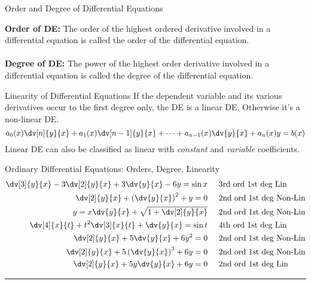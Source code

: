\begin{definition}{Order and Degree of Differential Equations}{}
    
    \textbf{Order of DE:} The order of the highest ordered derivative involved in a differential equation is called the order of the differential equation. \\~\\
    \textbf{Degree of DE:} The power of the highest order derivative involved in a differential equation is called the degree of the differential equation.
\end{definition}

\begin{definition}{Linearity of Differential Equations}{}
    If the dependent variable  and its various derivatives occur to the first degree only, the DE is a linear DE. Otherwise it's a non-linear DE. \[
        a_0(x)\dv[n]{y}{x} + a_1(x)\dv[n-1]{y}{x} + \cdots + a_{n-1}(x)\dv{y}{x} + a_n(x)y = b(x)
    \] Linear DE can also be classified as linear with \textit{constant} and \textit{variable} coefficients.
\end{definition}

\begin{example}{Ordinary Differential Equations: Orders, Degree, Linearity}{}
    \begin{align*}
        \dv[3]{y}{x} - 3\dv[2]{y}{x} + 3\dv{y}{x} - 6y = \sin{x} &\text\;\;\;\;\;\text{3rd ord 1st deg Lin} \\
        \dv[2]{y}{x} + \left( \dv{y}{x} \right)^2 + y = 0 &\text\;\;\;\;\;\text{2nd ord 1st deg Non-Lin} \\
        y = x\dv{y}{x} + \sqrt{1 + \dv[2]{y}{x} } &\text\;\;\;\;\;\text{2nd ord 1st deg Non-Lin} \\
        \dv[4]{x}{t} + t^2\dv[3]{x}{t} + \dv{y}{x} = \sin{t} &\text\;\;\;\;\;\text{4th ord 1st deg Lin} \\
        \dv[2]{y}{x} + 5\dv{y}{x} + 6y^2 = 0 &\text\;\;\;\;\;\text{2nd ord 1st deg Non-Lin} \\
        \dv[2]{y}{x} + 5 \left( \dv{y}{x} \right)^3 + 6y = 0 &\text\;\;\;\;\;\text{2nd ord 1st deg Non-Lin} \\
        \dv[2]{y}{x} + 5y\dv{y}{x} + 6y = 0 &\text\;\;\;\;\;\text{2nd ord 1st deg Lin}
    \end{align*}
\end{example}


\vspace{20pt}\rule{3in}{1pt}
